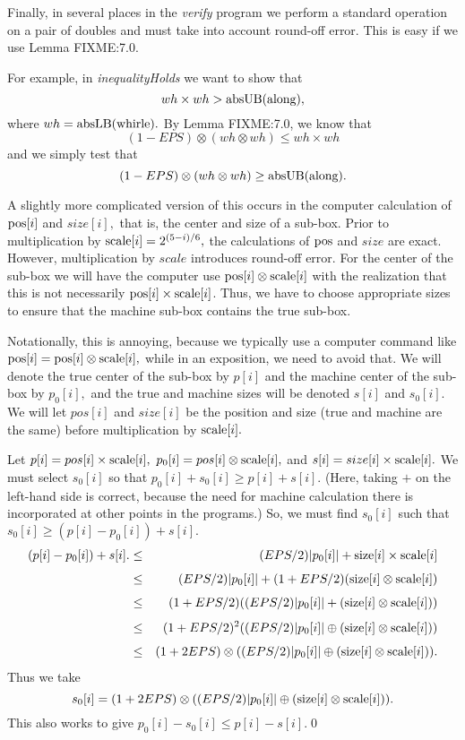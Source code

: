 Finally, in several places in the {\it verify} program we perform a standard operation on a pair of doubles and must take into account round-off error.  This is easy if we use Lemma FIXME:7.0.

For example, in {\it inequalityHolds} we want to show that $$wh \times wh  > {\rm absUB}{\rm (along),}$$ where $wh =
{\rm absLB}{\rm (whirle)}.$   
By Lemma FIXME:7.0, we know that $$(1 - EPS) \otimes (wh \otimes wh) \le wh \times wh$$ and we simply test that 
$$(1 - EPS) \otimes  (wh \otimes wh) \ge {\rm absUB}{\rm (along)}.$$

A slightly more complicated version of this occurs in the computer calculation of ${\rm pos}[i]$ and $size[i],$ that is, the center and size of a sub-box.  Prior to multiplication by ${\rm scale}[i] = 2 ^{(5 - i)/6},$  the calculations of ${\rm pos}$ and $size$ are exact.  However, multiplication by $scale$ introduces round-off error.  For the center of the sub-box we will have the computer use ${\rm pos}[i] \otimes {\rm scale}[i]$ with the realization that this is not necessarily ${\rm pos}[i] \times {\rm scale}[i]$.   Thus, we have to choose appropriate sizes to ensure that the machine sub-box contains the true sub-box.  

Notationally, this is annoying, because we typically use a computer command like ${\rm pos}[i] = {\rm pos}[i] \otimes {\rm scale}[i],$ while in an exposition, we need to avoid that.  We will denote the true center of the sub-box by $p[i]$ and the machine center of the sub-box by $p_0[i],$ and the true and machine sizes will be denoted $s[i]$ and $s_0[i].$  We will let $pos[i]$ and $size[i]$ be the position and size (true and machine are the same) before multiplication by ${\rm scale}[i].$

Let $p[i] = pos[i] \times {\rm scale}[i],\ p_0[i] = pos[i] \otimes {\rm scale}[i],$ and 
$s[i]= size[i] \times {\rm scale}[i].$  We must select $s_0[i]$ so that 
$p_0[i] + s_0[i] \ge p[i] + s[i].$  (Here, taking $+$ on the left-hand side is correct, because the need for machine calculation there is incorporated at other points in the programs.)  So, we must find $s_0[i]$ such that $s_0[i] \ge (p[i] - p_0[i]) + s[i].$
\begin{eqnarray*}
(p[i] - p_0[i]) + s[i]. &\le& (EPS/2) |p_0[i]| + {\rm size}[i] \times {\rm scale}[i]\\[4pt]
&\le& (EPS/2) |p_0[i]| + (1 + EPS/2) ({\rm size}[i] \otimes
{\rm scale}[i])\\[4pt]
&\le& (1 + EPS/2) ((EPS/2) |p_0[i]| +  ({\rm size}[i] \otimes {\rm scale}[i]))\\[4pt]
&\le& (1 + EPS/2)^2 ((EPS/2) |p_0[i]| \oplus  ({\rm size}[i]
\otimes {\rm scale}[i]))\\[4pt]
&\le& (1 + 2EPS) \otimes ((EPS/2) |p_0[i]| \oplus  ({\rm size}[i] \otimes {\rm scale}[i])).
\end{eqnarray*}
Thus we take 
$$s_0 [i]= (1 + 2EPS) \otimes ((EPS/2) |p_0[i]| \oplus  ({\rm size}[i] \otimes {\rm scale}[i])).$$
This also works to give $p_0[i] - s_0[i] \le p[i] - s[i].$\hfill\qed


 





